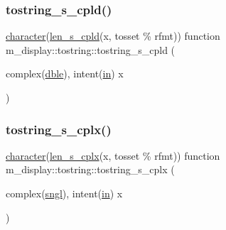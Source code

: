 \mbox{\label{interfacem__display_1_1tostring_a7c94acef6337ca15a858a4b1cfc1bd4e}} 
\subsubsection{\texorpdfstring{tostring\+\_\+s\+\_\+cpld()}{tostring\_s\_cpld()}}
{\footnotesize\ttfamily \hyperlink{option__stopwatch_83_8txt_abd4b21fbbd175834027b5224bfe97e66}{character}(\hyperlink{namespacem__display_ace35690c2f36e28f07336cc7dcff47f4}{len\+\_\+s\+\_\+cpld}(x, tosset \% rfmt)) function m\+\_\+display\+::tostring\+::tostring\+\_\+s\+\_\+cpld (\begin{DoxyParamCaption}\item[{complex(\hyperlink{namespacem__display_a46d90b75b6ccef7ccade133e5847e815}{dble}), intent(\hyperlink{M__journal_83_8txt_afce72651d1eed785a2132bee863b2f38}{in})}]{x }\end{DoxyParamCaption})\hspace{0.3cm}{\ttfamily [private]}}

\mbox{\label{interfacem__display_1_1tostring_a2e40aeaad43cc624647e060bf631d1a0}} 
\subsubsection{\texorpdfstring{tostring\+\_\+s\+\_\+cplx()}{tostring\_s\_cplx()}}
{\footnotesize\ttfamily \hyperlink{option__stopwatch_83_8txt_abd4b21fbbd175834027b5224bfe97e66}{character}(\hyperlink{namespacem__display_a7b573fb0cba7c7c954a820cdfe1c7968}{len\+\_\+s\+\_\+cplx}(x, tosset \% rfmt)) function m\+\_\+display\+::tostring\+::tostring\+\_\+s\+\_\+cplx (\begin{DoxyParamCaption}\item[{complex(\hyperlink{namespacem__display_a2ac86bc535c3ccc5947dbb3109c666b5}{sngl}), intent(\hyperlink{M__journal_83_8txt_afce72651d1eed785a2132bee863b2f38}{in})}]{x }\end{DoxyParamCaption})\hspace{0.3cm}{\ttfamily [private]}}

